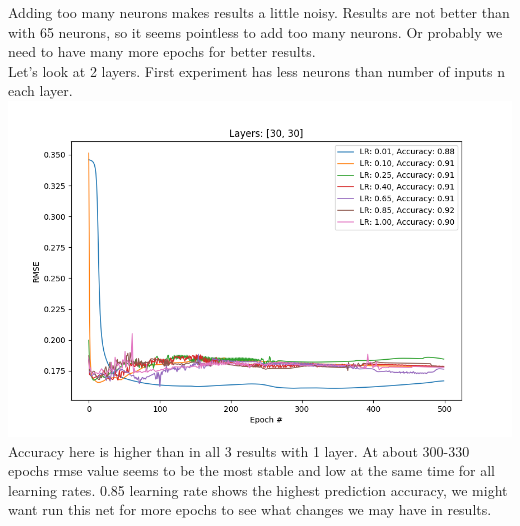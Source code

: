 \documentclass[12pt, letterpaper]{article}
\begin{document}
\begin{enumerate}[label=\Roman*.]
	Adding too many neurons makes results a little noisy. Results are not better than with 65 neurons, so it seems pointless to add too many neurons. Or probably we need to have many more epochs for better results. \\
	
	 Let's look at 2 layers. First experiment has less neurons than number of inputs n each layer.
	 {\center \includegraphics[scale=0.7]{../images/rmse_4.png} \\}
	 Accuracy here is higher than in all 3 results with 1 layer. At about 300-330 epochs rmse value seems to be the most stable and low at the same time for all learning rates. 0.85 learning rate shows the highest prediction accuracy, we might want run this net for more epochs to see what changes we may have in results.\\
	 

\end{enumerate}
\end{document}
